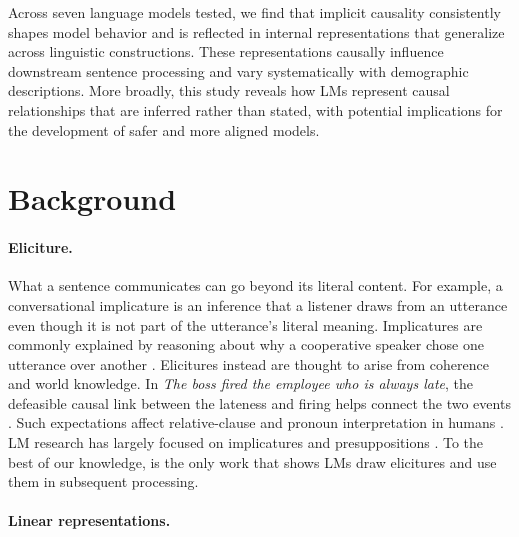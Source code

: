 \documentclass[11pt]{article}
\begin{document}
Across seven language models tested, we find that implicit causality consistently shapes model behavior and is reflected in internal representations that generalize across linguistic constructions. These representations causally influence downstream sentence processing and vary systematically with demographic descriptions. More broadly, this study reveals how LMs represent causal relationships that are inferred rather than stated,
with potential implications for the development of safer and more aligned models.

\section{Background}

\paragraph{Eliciture.}

What a sentence communicates can go beyond its literal content. For example, a conversational implicature is an inference that a listener draws from an utterance even though it is not part of the utterance's literal meaning. Implicatures are commonly explained by reasoning about why a cooperative speaker chose one utterance over another \citep{grice-1975-logic}. Elicitures instead are thought to arise from coherence and world knowledge. In \emph{The boss fired the employee who is always late}, the defeasible causal link between the lateness and firing helps connect the two events \citep{cohen-kehler-2021-conversational}. Such expectations affect relative-clause and pronoun interpretation in humans \citep{rohde-etal-2011-anticipating,kehler-rohde-2019-prominence}. LM research has largely focused on implicatures and presuppositions \citep{hu-etal-2023-fine,jeretic-etal-2020-natural}. To the best of our knowledge, \citet{pan-kehler-2025-pragmatic} is the only work that shows LMs draw elicitures and use them in subsequent processing. %

\paragraph{Linear representations.}
\end{document}
